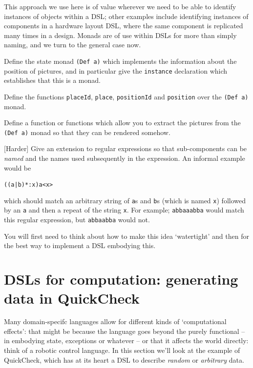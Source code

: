 This approach we use here is of value wherever we need to be able to identify instances of objects within a DSL; other examples include identifying instances of components in a hardware layout DSL, where the same component is replicated many times in a design. Monads are of use within DSLs for more than simply naming, and we turn to the general case now.

\begin{exercises}
\item
Define the state monad \texttt{(Def a)} which implements the information about the position of pictures, and in particular give the \texttt{instance} declaration which establishes that this is a monad.

\item
Define the functions \texttt{placeId}, \texttt{place}, \texttt{positionId} and \texttt{position} over the \texttt{(Def a)} monad.

\item
Define a function or functions which allow you to extract the pictures from the \texttt{(Def a)} monad so that they can be rendered somehow.

\item{[Harder]}
Give an extension to regular expressions so that sub-components can be \emph{named} and the names used subsequently in the expression. An informal example would be 
\begin{alltt}
((a|b)*:x)a<x>
\end{alltt}
which should match an arbitrary string of \texttt{a}s and \texttt{b}s (which is named \texttt{x}) followed by an \texttt{a} and then a repeat of the string \texttt{x}. For example; \texttt{abbaaabba} would match this regular expression, but \texttt{abbaabba} would not.

You will first need to think about how to make this idea `watertight' and then for the best way to implement a DSL embodying this. 


\end{exercises}


\section{DSLs for computation: generating data in QuickCheck}
\label{qcGens}

Many domain-specifc languages allow for different kinds of `computational effects': that might be because the language goes beyond the purely functional -- in embodying state, exceptions or whatever -- or that it affects the world directly: think of a robotic control language. In this section we'll look at the example of QuickCheck, which has at its heart a DSL to describe \emph{random} or \emph{arbitrary} data.

